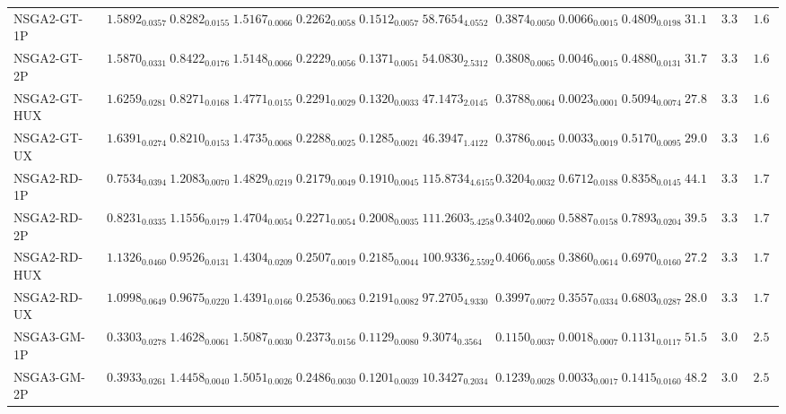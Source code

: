 \documentclass[11pt,a4paper]{article}
\begin{document}
\begin{table}[H]
{\begin{tabular}{lcccccccccccc}
NSGA2-GT-1P & $\mathbf{1.5892}_{0.0357}$ & $\mathbf{0.8282}_{0.0155}$ & $1.5167_{0.0066}$ & $0.2262_{0.0058}$ & $0.1512_{0.0057}$ & $58.7654_{4.0552}$ & $0.3874_{0.0050}$ & $0.0066_{0.0015}$ & $0.4809_{0.0198}$ & $31.11$ & $3.33$ & $\mathbf{1.67}$ \\
NSGA2-GT-2P & $\mathbf{1.5870}_{0.0331}$ & $0.8422_{0.0176}$ & $1.5148_{0.0066}$ & $0.2229_{0.0056}$ & $0.1371_{0.0051}$ & $54.0830_{2.5312}$ & $0.3808_{0.0065}$ & $0.0046_{0.0015}$ & $0.4880_{0.0131}$ & $31.78$ & $3.33$ & $\mathbf{1.67}$ \\
NSGA2-GT-HUX & $\mathbf{1.6259}_{0.0281}$ & $\mathbf{0.8271}_{0.0168}$ & $1.4771_{0.0155}$ & $0.2291_{0.0029}$ & $0.1320_{0.0033}$ & $47.1473_{2.0145}$ & $0.3788_{0.0064}$ & $0.0023_{0.0001}$ & $0.5094_{0.0074}$ & $27.89$ & $3.33$ & $\mathbf{1.67}$ \\
NSGA2-GT-UX & $\mathbf{1.6391}_{0.0274}$ & $\mathbf{0.8210}_{0.0153}$ & $1.4735_{0.0068}$ & $0.2288_{0.0025}$ & $0.1285_{0.0021}$ & $46.3947_{1.4122}$ & $0.3786_{0.0045}$ & $0.0033_{0.0019}$ & $0.5170_{0.0095}$ & $29.00$ & $3.33$ & $\mathbf{1.67}$ \\
NSGA2-RD-1P & $0.7534_{0.0394}$ & $1.2083_{0.0070}$ & $1.4829_{0.0219}$ & $0.2179_{0.0049}$ & $0.1910_{0.0045}$ & $\mathbf{115.8734}_{4.6155}$ & $0.3204_{0.0032}$ & $0.6712_{0.0188}$ & $0.8358_{0.0145}$ & $44.11$ & $3.33$ & $1.78$ \\
NSGA2-RD-2P & $0.8231_{0.0335}$ & $1.1556_{0.0179}$ & $1.4704_{0.0054}$ & $0.2271_{0.0054}$ & $0.2008_{0.0035}$ & $\mathbf{111.2603}_{5.4258}$ & $0.3402_{0.0060}$ & $0.5887_{0.0158}$ & $0.7893_{0.0204}$ & $39.56$ & $3.33$ & $1.78$ \\
NSGA2-RD-HUX & $1.1326_{0.0460}$ & $0.9526_{0.0131}$ & $1.4304_{0.0209}$ & $0.2507_{0.0019}$ & $0.2185_{0.0044}$ & $100.9336_{2.5592}$ & $\mathbf{0.4066}_{0.0058}$ & $0.3860_{0.0614}$ & $0.6970_{0.0160}$ & $27.22$ & $3.33$ & $1.78$ \\
NSGA2-RD-UX & $1.0998_{0.0649}$ & $0.9675_{0.0220}$ & $1.4391_{0.0166}$ & $0.2536_{0.0063}$ & $0.2191_{0.0082}$ & $97.2705_{4.9330}$ & $\mathbf{0.3997}_{0.0072}$ & $0.3557_{0.0334}$ & $0.6803_{0.0287}$ & $28.00$ & $3.33$ & $1.78$ \\
NSGA3-GM-1P & $0.3303_{0.0278}$ & $1.4628_{0.0061}$ & $1.5087_{0.0030}$ & $0.2373_{0.0156}$ & $0.1129_{0.0080}$ & $9.3074_{0.3564}$ & $0.1150_{0.0037}$ & $0.0018_{0.0007}$ & $0.1131_{0.0117}$ & $51.56$ & $3.00$ & $2.56$ \\
NSGA3-GM-2P & $0.3933_{0.0261}$ & $1.4458_{0.0040}$ & $1.5051_{0.0026}$ & $0.2486_{0.0030}$ & $0.1201_{0.0039}$ & $10.3427_{0.2034}$ & $0.1239_{0.0028}$ & $0.0033_{0.0017}$ & $0.1415_{0.0160}$ & $48.22$ & $3.00$ & $2.56$ \\

\end{tabular}}
\end{table}
\end{document}
